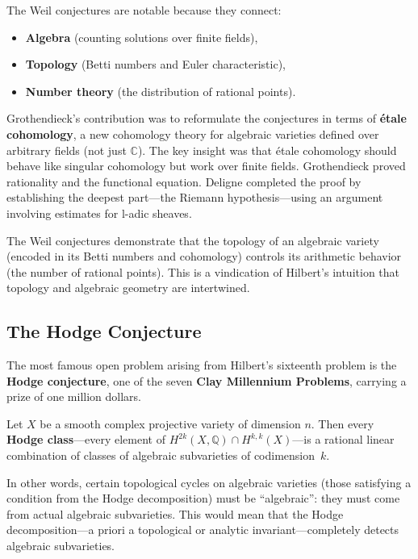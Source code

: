 The Weil conjectures are notable because they connect:
\begin{itemize}
    \item \textbf{Algebra} (counting solutions over finite fields),
    \item \textbf{Topology} (Betti numbers and Euler characteristic),
    \item \textbf{Number theory} (the distribution of rational points).
\end{itemize}

Grothendieck's contribution was to reformulate the conjectures in terms of \textbf{\'{e}tale cohomology}, a new cohomology theory for algebraic varieties defined over arbitrary fields (not just $\mathbb{C}$). The key insight was that \'etale cohomology should behave like singular cohomology but work over finite fields. Grothendieck proved rationality and the functional equation. Deligne completed the proof by establishing the deepest part---the Riemann hypothesis---using an argument involving estimates for l-adic sheaves.

The Weil conjectures demonstrate that the topology of an algebraic variety (encoded in its Betti numbers and cohomology) controls its arithmetic behavior (the number of rational points). This is a vindication of Hilbert's intuition that topology and algebraic geometry are intertwined.

\subsection{The Hodge Conjecture}

The most famous open problem arising from Hilbert's sixteenth problem is the \textbf{Hodge conjecture}, one of the seven \textbf{Clay Millennium Problems}, carrying a prize of one million dollars.

\begin{conjecture}\label{conj:hodge}
Let $X$ be a smooth complex projective variety of dimension $n$. Then every \textbf{Hodge class}---every element of $H^{2k}(X, \mathbb{Q}) \cap H^{k,k}(X)$---is a rational linear combination of classes of algebraic subvarieties of codimension~$k$.
\end{conjecture}

In other words, certain topological cycles on algebraic varieties (those satisfying a condition from the Hodge decomposition) must be ``algebraic'': they must come from actual algebraic subvarieties. This would mean that the Hodge decomposition---a priori a topological or analytic invariant---completely detects algebraic subvarieties.

